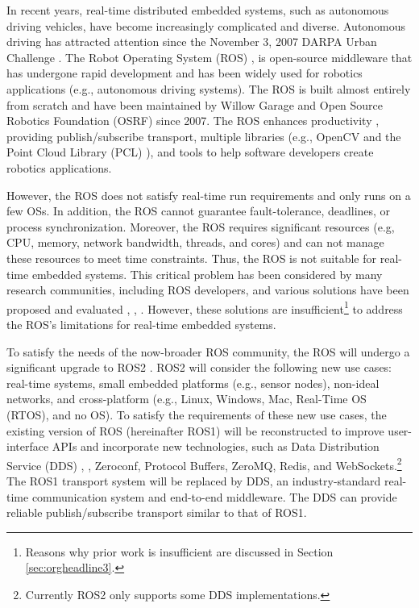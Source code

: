 \documentclass{sig-alternate-05-2015}
\begin{document}
In recent years, real-time distributed embedded systems, such as autonomous driving vehicles, have become increasingly complicated and diverse.
Autonomous driving has attracted attention since the November 3, 2007 DARPA Urban Challenge \cite{urmson2008autonomous}.
The Robot Operating System (ROS) \cite{quigley2009ros}, \cite{rosorg} is open-source middleware that has undergone rapid development \cite{cousins2011exponential} and has been widely used for robotics applications (e.g., autonomous driving systems).
The ROS is built almost entirely from scratch and have been maintained by Willow Garage \cite{willowgarage} and Open Source Robotics Foundation (OSRF) \cite{osrf} since 2007. 
The ROS enhances productivity \cite{cousins2010sharing}, providing publish/subscribe transport, multiple libraries (e.g., OpenCV \cite{opencv} and the Point Cloud Library (PCL) \cite{pcl}), and tools to help software developers create robotics applications.

However, the ROS does not satisfy real-time run requirements and only runs on a few OSs. 
In addition, the ROS cannot guarantee fault-tolerance, deadlines, or process synchronization.
Moreover, the ROS requires significant resources (e.g, CPU, memory, network bandwidth, threads, and cores) and can not manage these resources to meet time constraints.
Thus, the ROS is not suitable for real-time embedded systems. 
This critical problem has been considered by many research communities, including ROS developers, and various solutions have been proposed and evaluated \cite{rosc@roscon2013}, \cite{uros@roscon2013}, \cite{wei2015rt}.
However, these solutions are insufficient\footnote{Reasons why prior work is insufficient are discussed in Section \ref{sec:orgheadline3}.}  to address the ROS's limitations for real-time embedded systems. 


To satisfy the needs of the now-broader ROS community, the ROS will undergo a significant upgrade to ROS2 \cite{ros2_iccps2016}. 
ROS2 will consider the following new use cases: real-time systems, small embedded platforms (e.g., sensor nodes), non-ideal networks, and cross-platform (e.g., Linux, Windows, Mac, Real-Time OS (RTOS), and no OS).
To satisfy the requirements of these new use cases, the existing version of ROS (hereinafter ROS1) will be reconstructed to improve user-interface APIs and incorporate new technologies, such as Data Distribution Service (DDS) \cite{pardo2003omg}, \cite{schlesselman2004omg}, Zeroconf, Protocol Buffers, ZeroMQ, Redis, and WebSockets.\footnote{Currently ROS2 only supports some DDS implementations.}
The ROS1 transport system will be replaced by DDS, an industry-standard real-time communication system and end-to-end middleware. 
The DDS can provide reliable publish/subscribe transport similar to that of ROS1.
\end{document}
